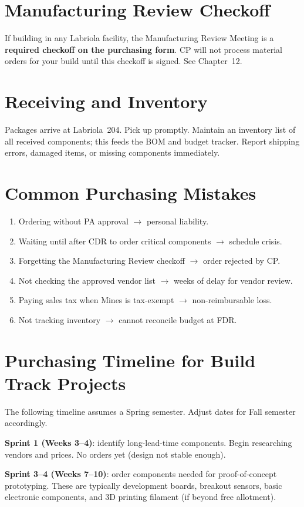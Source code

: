 \section{Manufacturing Review Checkoff}
If building in any Labriola facility, the Manufacturing Review Meeting is a \textbf{required checkoff on the purchasing form}. CP will not process material orders for your build until this checkoff is signed. See Chapter~12.

\section{Receiving and Inventory}
Packages arrive at Labriola~204. Pick up promptly. Maintain an inventory list of all received components; this feeds the BOM and budget tracker. Report shipping errors, damaged items, or missing components immediately.

\section{Common Purchasing Mistakes}
\begin{enumerate}[nosep,leftmargin=1.5em]
\item Ordering without PA approval $\to$ personal liability.
\item Waiting until after CDR to order critical components $\to$ schedule crisis.
\item Forgetting the Manufacturing Review checkoff $\to$ order rejected by CP.
\item Not checking the approved vendor list $\to$ weeks of delay for vendor review.
\item Paying sales tax when Mines is tax-exempt $\to$ non-reimbursable loss.
\item Not tracking inventory $\to$ cannot reconcile budget at FDR.
\end{enumerate}


\section{Purchasing Timeline for Build Track Projects}
The following timeline assumes a Spring semester. Adjust dates for Fall semester accordingly.

\textbf{Sprint 1 (Weeks 3--4)}: identify long-lead-time components. Begin researching vendors and prices. No orders yet (design not stable enough).

\textbf{Sprint 3--4 (Weeks 7--10)}: order components needed for proof-of-concept prototyping. These are typically development boards, breakout sensors, basic electronic components, and 3D printing filament (if beyond free allotment).

